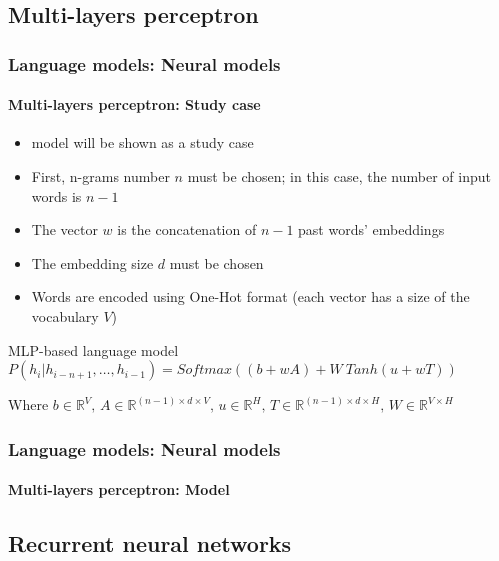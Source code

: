 \documentclass[xcolor=table]{beamer}
\begin{document}
\subsection{Multi-layers perceptron}

\begin{frame}
\frametitle{Language models: Neural models}
\framesubtitle{Multi-layers perceptron: Study case}

\begin{itemize}
	\item \cite{2003-bengio-al} model will be shown as a study case
	\item First, n-grams number $n$ must be chosen; in this case, the number of input words is $n-1$
	\item The vector $w$ is the concatenation of $n-1$ past words' embeddings
	\item The embedding size $d$ must be chosen  
	\item Words are encoded using One-Hot format (each vector has a size of the vocabulary $V$)
\end{itemize}

\begin{block}{MLP-based language model}
	$
	P(h_i|h_{i-n+1},\ldots, h_{i-1}) = 
	Softmax \left(
	(b + w A) 
	+ 
	W\ Tanh(u + w T)
	\right)
	$
	
	Where $b \in \mathbb{R}^{V},\, A \in \mathbb{R}^{(n-1) \times d \times V},\, u \in \mathbb{R}^{H},\, T \in \mathbb{R}^{(n-1) \times d \times H},\, W \in \mathbb{R}^{V \times H}$
\end{block}

\end{frame}

\begin{frame}
\frametitle{Language models: Neural models}
\framesubtitle{Multi-layers perceptron: Model}

\vspace{-16pt}
\begin{center}
\end{center}

\end{frame}

\subsection{Recurrent neural networks}
\end{document}

